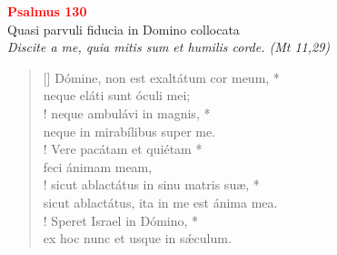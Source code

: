 


\def\greinitialformat#1{%
{\fontsize{39}{39}\selectfont #1}%
}




\vspace{0.3cm}
\begin{center}
 \textcolor{red}{\large \bf Psalmus 130}\\
Quasi parvuli fiducia in Domino collocata\\
\textit{\small Discite a me, quia mitis sum et humilis corde. (Mt 11,29)}
\end{center}
\begin{verse}[\versewidth]
Dómine, non est exaltátum cor meum, *\\
neque eláti sunt óculi mei;\\!
\vin neque ambulávi in magnis, *\\
\vin neque in mirabílibus super me.\\!
Vere pacátam et quiétam *\\
feci ánimam meam,\\!
\vin sicut ablactátus in sinu matris suæ, *\\
\vin sicut ablactátus, ita in me est ánima mea.\\!
Speret Israel in Dómino, *\\
ex hoc nunc et usque in s\'{æ}culum.\\
\end{verse}
\vspace{1cm}


